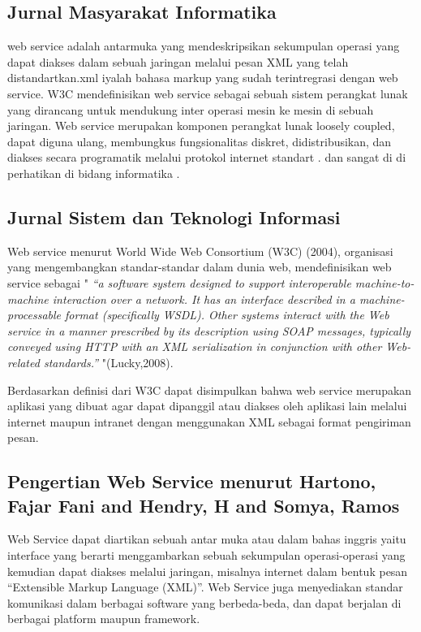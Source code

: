 \documentclass[12pt]{article}
\begin{document}
\subsection{Jurnal Masyarakat Informatika}

web service adalah antarmuka yang mendeskripsikan sekumpulan operasi yang dapat diakses dalam sebuah jaringan melalui pesan XML yang telah distandartkan.xml iyalah bahasa markup yang sudah terintregrasi dengan web service. W3C mendefinisikan web service sebagai sebuah sistem perangkat lunak yang dirancang untuk mendukung inter operasi mesin ke mesin di sebuah jaringan.  Web service merupakan komponen perangkat lunak loosely coupled, dapat diguna ulang, membungkus fungsionalitas diskret, didistribusikan, dan diakses secara programatik melalui protokol internet standart . dan sangat di di perhatikan di bidang informatika \cite{saputra2integrasi}.

\subsection{Jurnal Sistem dan Teknologi Informasi}

Web service menurut World Wide Web Consortium (W3C) (2004), organisasi yang mengembangkan standar-standar dalam dunia web, mendefinisikan web service sebagai "
\textit{“a software system designed to support interoperable machine-to-machine interaction over a network. It has an interface described in a machine-processable format (specifically WSDL). Other systems interact with the Web service in a manner prescribed by its description using SOAP messages, typically conveyed using HTTP with an XML serialization in conjunction with other Web-related standards.” }"(Lucky,2008).

Berdasarkan definisi dari W3C dapat disimpulkan bahwa web service merupakan aplikasi yang dibuat agar dapat dipanggil atau diakses oleh aplikasi lain melalui internet maupun intranet dengan menggunakan XML sebagai format pengiriman pesan\cite{prasetya2013perancangan}.

\subsection{Pengertian Web Service menurut Hartono, Fajar Fani and Hendry, H and Somya, Ramos}

Web Service dapat diartikan sebuah antar muka atau dalam bahas inggris yaitu interface  yang berarti menggambarkan sebuah sekumpulan operasi-operasi yang kemudian dapat diakses melalui jaringan, misalnya internet dalam bentuk pesan “Extensible Markup Language (XML)”. Web Service juga menyediakan standar komunikasi dalam berbagai software yang berbeda-beda, dan dapat berjalan di berbagai platform maupun framework\cite{hartono2013aplikasi}.
\end{document}
